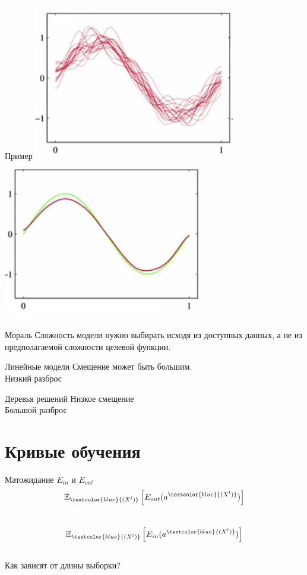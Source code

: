 \documentclass[10pt]{beamer}
\newcommand{\xblue}{\textcolor{blue}{(X^l)}}
\begin{document}
\begin{frame}{Пример}
  \centering
  \includegraphics[width=0.5 \textwidth, keepaspectratio]{images/example2}
  \includegraphics[width=0.5 \textwidth, keepaspectratio]{images/example1}
\end{frame}

\begin{frame}{Мораль}
  Сложность модели нужно выбирать исходя из доступных данных, а не из предполагаемой сложности целевой функции.
\end{frame}

\begin{frame}{Линейные модели}
  Смещение может быть большим.\\
  \bigbreak
  Низкий разброс
\end{frame}

\begin{frame}{Деревья решений}
  Низкое смещение \\
  \bigbreak
  Большой разброс
\end{frame}

\section{Кривые обучения}

\begin{frame}{Матожидание $E_{in}$ и $E_{out}$}
  $$\mathbb{E}_{\xblue} \left[ E_{out}(a^{\xblue}) \right] $$\\
  \bigbreak \pause
  $$\mathbb{E}_{\xblue} \left[ E_{in}(a^{\xblue}) \right] $$\\
  \bigbreak \pause
  Как зависят от длины выборки?
\end{frame}
\end{document}
